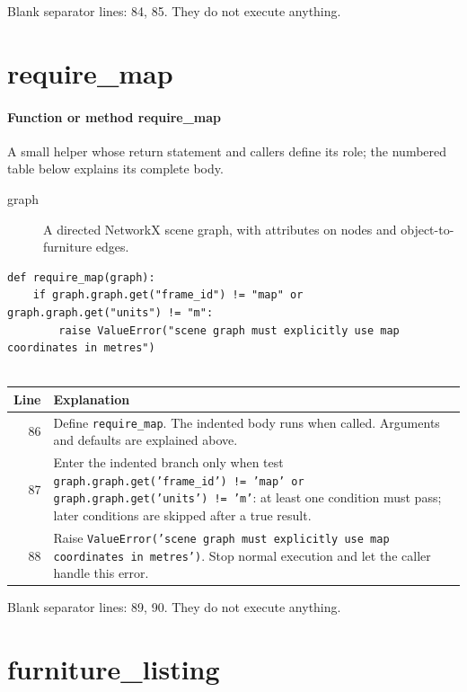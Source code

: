 \documentclass[11pt,a4paper]{book}
\begin{document}
Blank separator lines: 84, 85. They do not execute anything.

\section{require\_map}

\paragraph{Function or method require\_map}
A small helper whose return statement and callers define its role; the numbered table below explains its complete body.

\begin{description}
\item[graph] A directed NetworkX scene graph, with attributes on nodes and object-to-furniture edges.
\end{description}

\begin{lstlisting}[firstnumber=86]
def require_map(graph):
    if graph.graph.get("frame_id") != "map" or graph.graph.get("units") != "m":
        raise ValueError("scene graph must explicitly use map coordinates in metres")


\end{lstlisting}

\begin{longtable}{r p{}}

\textbf{Line} & \textbf{Explanation} \\ \hline \endhead

86 & Define \texttt{require\_map}. The indented body runs when called. Arguments and defaults are explained above. \\

87 & Enter the indented branch only when test \texttt{graph.graph.get('frame\_id') != 'map' or graph.graph.get('units') != 'm'}: at least one condition must pass; later conditions are skipped after a true result. \\

88 & Raise \texttt{ValueError('scene graph must explicitly use map coordinates in metres')}. Stop normal execution and let the caller handle this error. \\

\end{longtable}

Blank separator lines: 89, 90. They do not execute anything.

\section{furniture\_listing}
\end{document}
